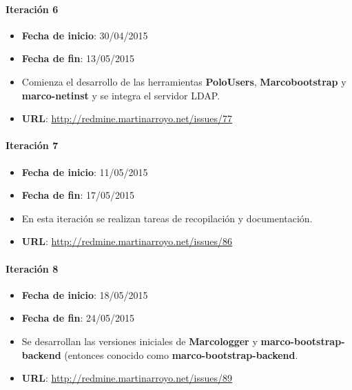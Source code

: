 \paragraph{Iteración 6\\}
\begin{itemize}
\item \textbf{Fecha de inicio}: 30/04/2015
\item \textbf{Fecha de fin}: 13/05/2015
\item Comienza el desarrollo de las herramientas \textbf{PoloUsers}, \textbf{Marcobootstrap} y \textbf{marco-netinst} y se integra el servidor LDAP.
\item \textbf{URL}: \href{http://redmine.martinarroyo.net/issues/77}{http://redmine.martinarroyo.net/issues/77}
\end{itemize}


\paragraph{Iteración 7\\}
\begin{itemize}
\item \textbf{Fecha de inicio}: 11/05/2015
\item \textbf{Fecha de fin}: 17/05/2015
\item En esta iteración se realizan tareas de recopilación y documentación.
\item \textbf{URL}: \href{http://redmine.martinarroyo.net/issues/86}{http://redmine.martinarroyo.net/issues/86}
\end{itemize}


\paragraph{Iteración 8\\}
\begin{itemize}
\item \textbf{Fecha de inicio}: 18/05/2015
\item \textbf{Fecha de fin}: 24/05/2015
\item Se desarrollan las versiones iniciales de \textbf{Marcologger} y \textbf{marco-bootstrap-backend} (entonces conocido como \textbf{marco-bootstrap-backend}.
\item \textbf{URL}: \href{http://redmine.martinarroyo.net/issues/89}{http://redmine.martinarroyo.net/issues/89}
\end{itemize}


